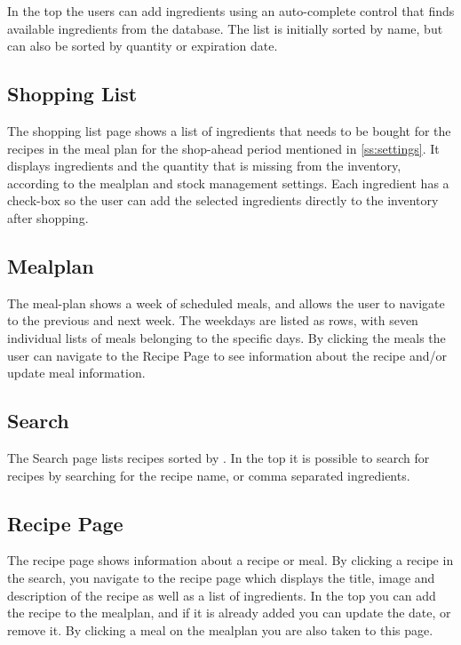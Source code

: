 In the top the users can add ingredients using an auto-complete control that finds available ingredients from the database. The list is initially sorted by name, but can also be sorted by quantity or expiration date.

\subsection{Shopping List}
The shopping list page shows a list of ingredients that needs to be bought for the recipes in the meal plan for the shop-ahead period mentioned in \cref{ss:settings}. It displays ingredients and the quantity that is missing from the inventory, according to the mealplan and stock management settings. Each ingredient has a check-box so the user can add the selected ingredients directly to the inventory after shopping.

\subsection{Mealplan}
The meal-plan shows a week of scheduled meals, and allows the user to navigate to the previous and next week. The weekdays are listed as rows, with seven individual lists of meals belonging to the specific days. By clicking the meals the  user can navigate to the Recipe Page to see information about the recipe and/or update meal information.

\subsection{Search}
The Search page lists recipes sorted by .
In the top it is possible to search for recipes by searching for the recipe name, or comma separated ingredients.

\subsection{Recipe Page}
The recipe page shows information about a recipe or meal. By clicking a recipe in the search, you navigate to the recipe page which displays the title, image and description of the recipe as well as a list of ingredients. In the top you can add the recipe to the mealplan, and if it is already added you can update the date, or remove it.
By clicking a meal on the mealplan you are also taken to this page.

